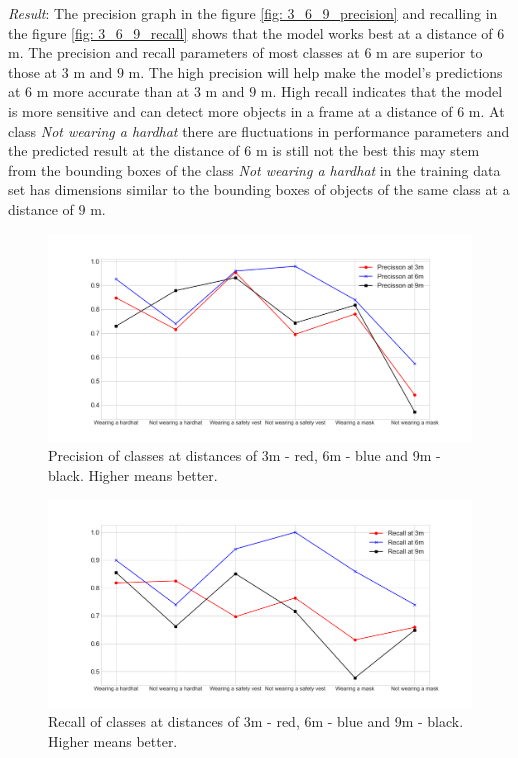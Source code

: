 \documentclass[conference]{IEEEtran}
\begin{document}
\emph{Result}: The precision graph in the figure \ref{fig: 3_6_9_precision} and recalling in the figure \ref{fig: 3_6_9_recall} shows that the model works best at a distance of $ 6 $ m. The precision and recall parameters of most classes at $ 6 $ m are superior to those at $ 3 $ m and $ 9 $ m. The high precision will help make the model's predictions at $ 6 $ m more accurate than at $ 3 $ m and $ 9 $ m. High recall indicates that the model is more sensitive and can detect more objects in a frame at a distance of $ 6 $ m. At class \emph{Not wearing a hardhat} there are fluctuations in performance parameters and the predicted result at the distance of $ 6 $ m is still not the best this may stem from the bounding boxes of the class \emph{Not wearing a hardhat} in the training data set has dimensions similar to the bounding boxes of objects of the same class at a distance of $ 9 $ m.
\begin{figure}[ht!]
	\centerline{\includegraphics[scale=0.3]{images/3_6_9_precision.png}}
  	\caption{Precision of classes at distances of 3m - red, 6m - blue and 9m - black. Higher means better.}
  	\label{fig:3_6_9_precision}
\end{figure}
\begin{figure}[ht!]
	\centerline{\includegraphics[scale=0.3]{images/3_6_9_recall.png}}
  	\caption{Recall of classes at distances of 3m - red, 6m - blue and 9m - black. Higher means better.}
  	\label{fig:3_6_9_recall}
\end{figure}
\end{document}
